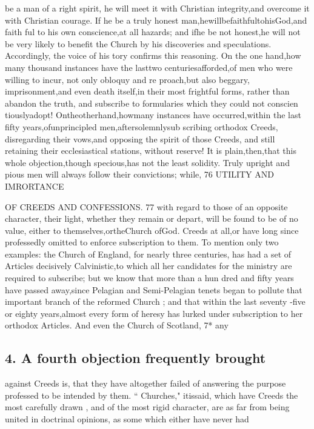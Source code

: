 \documentclass[
]{book}
\begin{document}
be a man of a right spirit, he will meet it with Christian integrity,and overcome it with
Christian courage. If he be a truly honest man,hewillbefaithfultohisGod,and faith
ful to his own conscience,at all hazards; and ifhe be not honest,he will not be very likely
to benefit the Church by his discoveries and speculations. Accordingly, the voice of his
tory confirms this reasoning. On the one hand,how many thousand instances have the lasttwo centuriesafforded,of men who were willing to incur, not only obloquy and re proach,but also beggary, imprisonment,and even death itself,in their most frightful forms, rather than abandon the truth, and subscribe to formularies which they could not conscien tiouslyadopt! Ontheotherhand,howmany instances have occurred,within the last fifty years,ofunprincipled men,aftersolemnlysub scribing orthodox Creeds, disregarding their vows,and opposing the spirit of those Creeds, and still retaining their ecclesiastical stations, without reserve! It is plain,then,that this whole objection,though specious,has not the
least solidity. Truly upright and pious men will always follow their convictions; while,
76
UTILITY AND IMRORTANCE

OF CREEDS AND CONFESSIONS. 77
with regard to those of an opposite character,
their light, whether they remain or depart, will be found to be of no value, either to themselves,ortheChurch ofGod.
Creeds
at all,or have long since professedly omitted to enforce subscription to them. To mention
only two examples: the Church of England, for nearly three centuries, has had a set of Articles decisively Calvinistic,to which all her candidates for the ministry are required to subscribe; but we know that more than a hun dred and fifty years have passed away,since Pelagian and Semi-Pelagian tenets began to pollute that important branch of the reformed Church ; and that within the last seventy -five or eighty years,almost every form of heresy has lurked under subscription to her orthodox Articles. And even the Church of Scotland,
7*
any

\hypertarget{a-fourth-objection-frequently-brought}{%
\subsection{4. A fourth objection frequently brought}\label{a-fourth-objection-frequently-brought}}

against Creeds is, that they have altogether
failed of answering the purpose professed to
be intended by them. `` Churches," itissaid, which have Creeds the most carefully drawn ,
and of the most rigid character, are as far
from being united in doctrinal opinions, as some which either have never had
\end{document}
